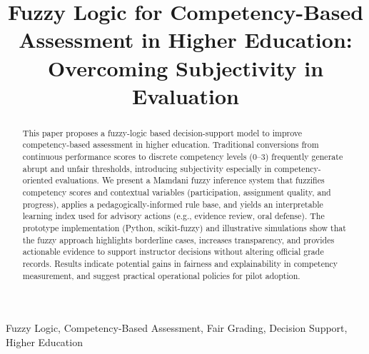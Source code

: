 \documentclass[conference]{IEEEtran}
\begin{document}
\title{Fuzzy Logic for Competency-Based Assessment in Higher Education: Overcoming Subjectivity in Evaluation}
\author{
}
\maketitle

\begin{abstract}
This paper proposes a fuzzy-logic based decision-support model to improve competency-based assessment in higher education. Traditional conversions from continuous performance scores to discrete competency levels (0–3) frequently generate abrupt and unfair thresholds, introducing subjectivity especially in competency-oriented evaluations. We present a Mamdani fuzzy inference system that fuzzifies competency scores and contextual variables (participation, assignment quality, and progress), applies a pedagogically-informed rule base, and yields an interpretable learning index used for advisory actions (e.g., evidence review, oral defense). The prototype implementation (Python, scikit-fuzzy) and illustrative simulations show that the fuzzy approach highlights borderline cases, increases transparency, and provides actionable evidence to support instructor decisions without altering official grade records. Results indicate potential gains in fairness and explainability in competency measurement, and suggest practical operational policies for pilot adoption.
\end{abstract}

\begin{IEEEkeywords}
Fuzzy Logic, Competency-Based Assessment, Fair Grading, Decision Support, Higher Education
\end{IEEEkeywords}











\end{document}
